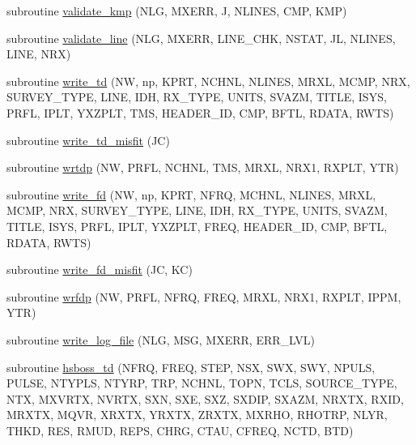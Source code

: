 \begin{DoxyCompactItemize}
\item 
subroutine \hyperlink{Leroi_8f90_a2cd90fa43f6deaeb4a86b02b8494d638}{validate\+\_\+kmp} (N\+LG, M\+X\+E\+RR, J, N\+L\+I\+N\+ES, C\+MP, K\+MP)
\item 
subroutine \hyperlink{Leroi_8f90_aac9f78ba0dc05544c1babba6dc4ac636}{validate\+\_\+line} (N\+LG, M\+X\+E\+RR, L\+I\+N\+E\+\_\+\+C\+HK, N\+S\+T\+AT, JL, N\+L\+I\+N\+ES, L\+I\+NE, N\+RX)
\item 
subroutine \hyperlink{Leroi_8f90_a050575d7cd77b6819922e9b6aa765af7}{write\+\_\+td} (NW, np, K\+P\+RT, N\+C\+H\+NL, N\+L\+I\+N\+ES, M\+R\+XL, M\+C\+MP, N\+RX, S\+U\+R\+V\+E\+Y\+\_\+\+T\+Y\+PE, L\+I\+NE, I\+DH, R\+X\+\_\+\+T\+Y\+PE, U\+N\+I\+TS, S\+V\+A\+ZM, T\+I\+T\+LE, I\+S\+YS, P\+R\+FL, I\+P\+LT, Y\+X\+Z\+P\+LT, T\+MS, H\+E\+A\+D\+E\+R\+\_\+\+ID, C\+MP, B\+F\+TL, R\+D\+A\+TA, R\+W\+TS)
\item 
subroutine \hyperlink{Leroi_8f90_ae92c690eb0a03d9faf58627a9777375f}{write\+\_\+td\+\_\+misfit} (JC)
\item 
subroutine \hyperlink{Leroi_8f90_a6dd9c54049a223ff90b461f73c11015a}{wrtdp} (NW, P\+R\+FL, N\+C\+H\+NL, T\+MS, M\+R\+XL, N\+R\+X1, R\+X\+P\+LT, Y\+TR)
\item 
subroutine \hyperlink{Leroi_8f90_ab3f62aa9d1d60322e81296cc809df15f}{write\+\_\+fd} (NW, np, K\+P\+RT, N\+F\+RQ, M\+C\+H\+NL, N\+L\+I\+N\+ES, M\+R\+XL, M\+C\+MP, N\+RX, S\+U\+R\+V\+E\+Y\+\_\+\+T\+Y\+PE, L\+I\+NE, I\+DH, R\+X\+\_\+\+T\+Y\+PE, U\+N\+I\+TS, S\+V\+A\+ZM, T\+I\+T\+LE, I\+S\+YS, P\+R\+FL, I\+P\+LT, Y\+X\+Z\+P\+LT, F\+R\+EQ, H\+E\+A\+D\+E\+R\+\_\+\+ID, C\+MP, B\+F\+TL, R\+D\+A\+TA, R\+W\+TS)
\item 
subroutine \hyperlink{Leroi_8f90_a099fdc373643714db817e823ef93b622}{write\+\_\+fd\+\_\+misfit} (JC, KC)
\item 
subroutine \hyperlink{Leroi_8f90_aa07d276404c70df8a716f8407fa09445}{wrfdp} (NW, P\+R\+FL, N\+F\+RQ, F\+R\+EQ, M\+R\+XL, N\+R\+X1, R\+X\+P\+LT, I\+P\+PM, Y\+TR)
\item 
subroutine \hyperlink{Leroi_8f90_a78d7005f266cbaf5c3ec23db494d00ba}{write\+\_\+log\+\_\+file} (N\+LG, M\+SG, M\+X\+E\+RR, E\+R\+R\+\_\+\+L\+VL)
\item 
subroutine \hyperlink{Leroi_8f90_a9b871caa6fa2f7ceadf6860a0a16a07b}{hsboss\+\_\+td} (N\+F\+RQ, F\+R\+EQ, S\+T\+EP, N\+SX, S\+WX, S\+WY, N\+P\+U\+LS, P\+U\+L\+SE, N\+T\+Y\+P\+LS, N\+T\+Y\+RP, T\+RP, N\+C\+H\+NL, T\+O\+PN, T\+C\+LS, S\+O\+U\+R\+C\+E\+\_\+\+T\+Y\+PE, N\+TX, M\+X\+V\+R\+TX, N\+V\+R\+TX, S\+XN, S\+XE, S\+XZ, S\+X\+D\+IP, S\+X\+A\+ZM, N\+R\+X\+TX, R\+X\+ID, M\+R\+X\+TX, M\+Q\+VR, X\+R\+X\+TX, Y\+R\+X\+TX, Z\+R\+X\+TX, M\+X\+R\+HO, R\+H\+O\+T\+RP, N\+L\+YR, T\+H\+KD, R\+ES, R\+M\+UD, R\+E\+PS, C\+H\+RG, C\+T\+AU, C\+F\+R\+EQ, N\+C\+TD, B\+TD)

\end{DoxyCompactItemize}

